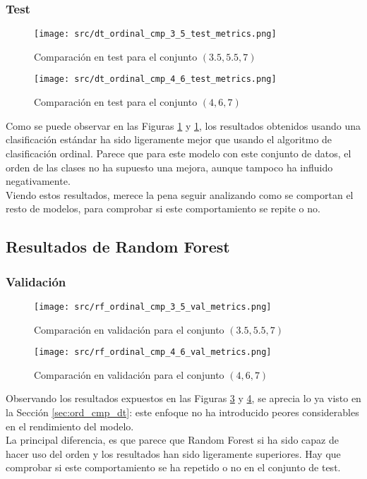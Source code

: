 \subsubsection*{Test}
\begin{figure}[H]
	\centering
	\texttt{[image: src/dt\_ordinal\_cmp\_3\_5\_test\_metrics.png]}
	\caption{Comparación en test para el conjunto  $(3.5,5.5,7)$}
	\label{fig:dt_ordin_test_cmp_1}
\end{figure}
\begin{figure}[H]
	\centering
	\texttt{[image: src/dt\_ordinal\_cmp\_4\_6\_test\_metrics.png]}
	\caption{Comparación en test para el conjunto  $(4,6,7)$}
	\label{fig:dt_ordin_test_cmp_2}
\end{figure}
Como se puede observar en las Figuras \ref{fig:dt_ordin_test_cmp_1} y \ref{fig:dt_ordin_test_cmp_1}, los resultados obtenidos usando una clasificación estándar ha sido ligeramente mejor que usando el algoritmo de clasificación ordinal. Parece que para este modelo con este conjunto de datos, el orden de las clases no ha supuesto una mejora, aunque tampoco ha influido negativamente.\\
\linebreak
Viendo estos resultados, merece la pena seguir analizando como se comportan el resto de modelos, para comprobar si este comportamiento se repite o no.
\clearpage
\subsection{Resultados de Random Forest}
\label{sec:ord_cmp_rf}
\subsubsection*{Validación}
\begin{figure}[H]
	\centering
	\texttt{[image: src/rf\_ordinal\_cmp\_3\_5\_val\_metrics.png]}
	\caption{Comparación en validación para el conjunto  $(3.5,5.5,7)$ }
	\label{fig:rf_ordin_val_cmp_1}
\end{figure}
\begin{figure}[H]
	\centering
	\texttt{[image: src/rf\_ordinal\_cmp\_4\_6\_val\_metrics.png]}
	\caption{Comparación en validación para el conjunto $(4,6,7)$}
	\label{fig:rf_ordin_val_cmp_2}
\end{figure}
Observando los resultados expuestos en las Figuras \ref{fig:rf_ordin_val_cmp_1} y \ref{fig:rf_ordin_val_cmp_2}, se aprecia lo ya visto en la Sección \ref{sec:ord_cmp_dt}: este enfoque no ha introducido peores considerables en el rendimiento del modelo.\\
\linebreak
La principal diferencia, es que parece que Random Forest si ha sido capaz de hacer uso del orden y los resultados han sido ligeramente superiores. Hay que comprobar si este comportamiento se ha repetido o no en el conjunto de test.
\clearpage
